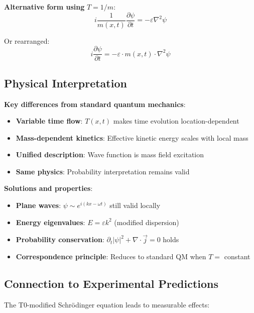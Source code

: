 \documentclass[12pt,a4paper]{article}
\theoremstyle{definition}
\theoremstyle{remark}
\begin{document}
	\textbf{Alternative form using} $T = 1/m$:
	\begin{equation}
		i \frac{1}{m(x,t)} \frac{\partial\psi}{\partial t} = -\varepsilon \nabla^2 \psi
		\label{eq:t0_schrodinger_mass}
	\end{equation}
	
	Or rearranged:
	\begin{equation}
		i \frac{\partial\psi}{\partial t} = -\varepsilon \cdot m(x,t) \cdot \nabla^2 \psi
		\label{eq:t0_schrodinger_rearranged}
	\end{equation}
	
	\subsection{Physical Interpretation}
	
	\textbf{Key differences from standard quantum mechanics}:
	\begin{itemize}
		\item \textbf{Variable time flow}: $T(x,t)$ makes time evolution location-dependent
		\item \textbf{Mass-dependent kinetics}: Effective kinetic energy scales with local mass
		\item \textbf{Unified description}: Wave function is mass field excitation
		\item \textbf{Same physics}: Probability interpretation remains valid
	\end{itemize}
	
	\textbf{Solutions and properties}:
	\begin{itemize}
		\item \textbf{Plane waves}: $\psi \sim e^{i(kx - \omega t)}$ still valid locally
		\item \textbf{Energy eigenvalues}: $E = \varepsilon k^2$ (modified dispersion)
		\item \textbf{Probability conservation}: $\partial_t|\psi|^2 + \nabla \cdot \vec{j} = 0$ holds
		\item \textbf{Correspondence principle}: Reduces to standard QM when $T = $ constant
	\end{itemize}
	
	\subsection{Connection to Experimental Predictions}
	
	The T0-modified Schrödinger equation leads to measurable effects:
	
\end{document}

